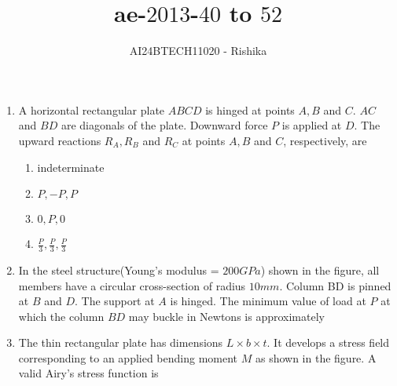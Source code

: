 \documentclass[journal,12pt,onecolumn]{IEEEtran}
\theoremstyle{remark}
\begin{document}

\vspace{3cm}

\title{ae-$2013$-$40$ to $52$}
\author{AI24BTECH11020 - Rishika}
\maketitle
\bigskip
\renewcommand{\thefigure}{\theenumi}
\renewcommand{\thetable}{\theenumi}
\begin{enumerate}[start=40]
\item A horizontal rectangular plate $ABCD$ is hinged at points $A, B$ and $C$. $AC$ and $BD$ are diagonals of the plate. Downward force $P$ is applied at $D$. The upward reactions $R_A,R_B$ and $R_C$ at points $A, B$ and $C$, respectively, are
	\begin{enumerate}
		\item indeterminate
		\item $P,-P,P$
		\item $0,P,0$
		\item $\frac{P}{3},\frac{P}{3},\frac{P}{3}$
	\end{enumerate}
\item In the steel structure(Young's modulus = $200 GPa$) shown in the figure, all members have a circular cross-section of radius $10 mm$. Column BD is pinned at $B$ and $D$. The support at $A$ is hinged. The minimum value of load at $P$ at which the column $BD$ may buckle in Newtons is approximately \underline{\hspace{2cm}} \\
	\begin{center}\end{center}
\item The thin rectangular plate has dimensions $L\times b\times t.$ It develops a stress field corresponding to an applied bending moment $M$ as shown in the figure. A valid Airy's stress function is\\\begin{center}\begin{tikzpicture}

\end{tikzpicture}
\end{center}
\end{enumerate}
\end{document}
